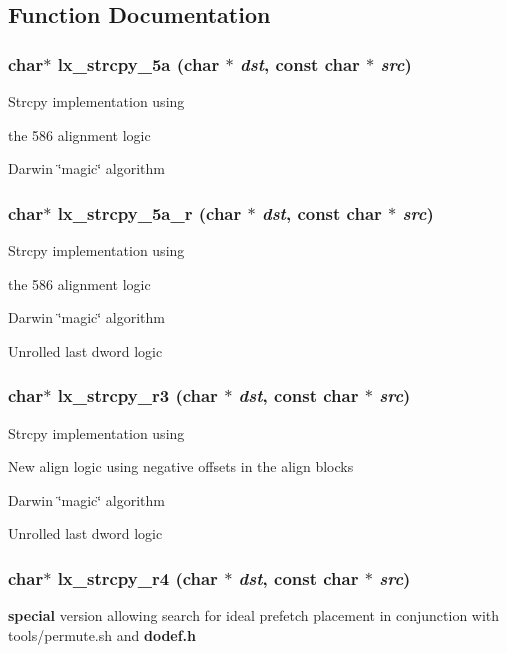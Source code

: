 \subsection{Function Documentation}
\subsubsection{\setlength{\rightskip}{0pt plus 5cm}char$\ast$ lx\_\-strcpy\_\-5a (char $\ast$ {\em dst}, const char $\ast$ {\em src})}\label{strcpy_2def__test_8h_a1}


Strcpy implementation using \begin{CompactItemize}
\item 
the 586 alignment logic\item 
Darwin \char`\"{}magic\char`\"{} algorithm \end{CompactItemize}
\subsubsection{\setlength{\rightskip}{0pt plus 5cm}char$\ast$ lx\_\-strcpy\_\-5a\_\-r (char $\ast$ {\em dst}, const char $\ast$ {\em src})}\label{strcpy_2def__test_8h_a2}


Strcpy implementation using \begin{CompactItemize}
\item 
the 586 alignment logic\item 
Darwin \char`\"{}magic\char`\"{} algorithm\item 
Unrolled last dword logic \end{CompactItemize}
\subsubsection{\setlength{\rightskip}{0pt plus 5cm}char$\ast$ lx\_\-strcpy\_\-r3 (char $\ast$ {\em dst}, const char $\ast$ {\em src})}\label{strcpy_2def__test_8h_a3}


Strcpy implementation using \begin{CompactItemize}
\item 
New align logic using negative offsets in the align blocks\item 
Darwin \char`\"{}magic\char`\"{} algorithm\item 
Unrolled last dword logic \end{CompactItemize}
\subsubsection{\setlength{\rightskip}{0pt plus 5cm}char$\ast$ lx\_\-strcpy\_\-r4 (char $\ast$ {\em dst}, const char $\ast$ {\em src})}\label{strcpy_2def__test_8h_a4}


{\bf special} version allowing search for ideal prefetch placement in conjunction with tools/permute.sh and {\bf dodef.h} 